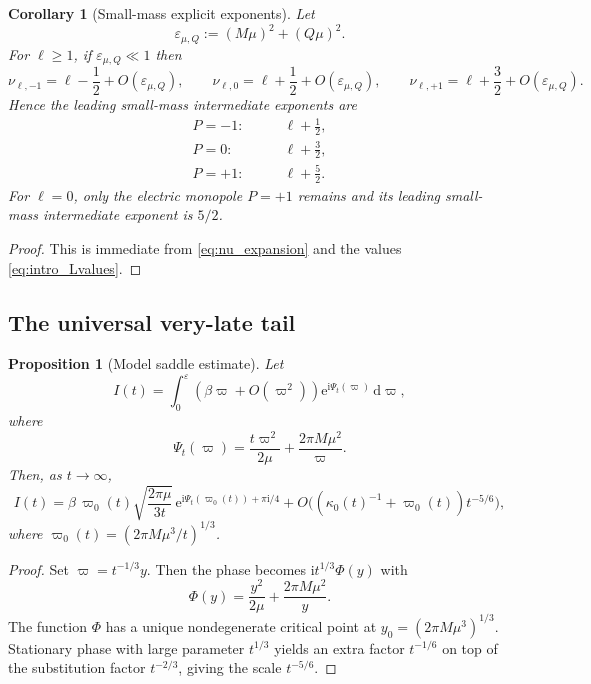 \documentclass[12pt]{article}
\numberwithin{equation}{section}
\theoremstyle{plain}
\newtheorem{proposition}[theorem]{Proposition}
\newtheorem{corollary}[theorem]{Corollary}
\theoremstyle{definition}
\theoremstyle{remark}
\newcommand{\ii}{\mathrm i}
\newcommand{\ee}{\mathrm e}
\newcommand{\dd}{\mathrm d}
\newcommand{\vp}{\varpi}
\newcommand{\kap}{\kappa}
\newcommand{\eps}{\varepsilon}
\begin{document}
\begin{corollary}[Small-mass explicit exponents]\label{cor:small_mass_explicit}
Let
\[
   \eps_{\mu,Q}:=(M\mu)^2+(Q\mu)^2.
\]
For $\ell\ge1$, if $\eps_{\mu,Q}\ll1$ then
\[
   \nu_{\ell,-1}=\ell-\frac12+O(\eps_{\mu,Q}),
   \qquad
   \nu_{\ell,0}=\ell+\frac12+O(\eps_{\mu,Q}),
   \qquad
   \nu_{\ell,+1}=\ell+\frac32+O(\eps_{\mu,Q}).
\]
Hence the leading small-mass intermediate exponents are
\begin{align*}
   P=-1:&\qquad \ell+\frac12,
   \\
   P=0:&\qquad \ell+\frac32,
   \\
   P=+1:&\qquad \ell+\frac52.
\end{align*}
For $\ell=0$, only the electric monopole $P=+1$ remains and its leading small-mass intermediate exponent is $5/2$.
\end{corollary}

\begin{proof}
This is immediate from \eqref{eq:nu_expansion} and the values \eqref{eq:intro_Lvalues}.
\end{proof}

\subsection{The universal very-late tail}

\begin{proposition}[Model saddle estimate]\label{prop:saddle_estimate}
Let
\begin{equation}\label{eq:generic_saddle_integral}
   I(t)=\int_0^\eps(\beta\vp+O(\vp^2))\ee^{\ii\Psi_t(\vp)}\,\dd\vp,
\end{equation}
where
\begin{equation}\label{eq:phase_function}
   \Psi_t(\vp)=\frac{t\vp^2}{2\mu}+\frac{2\pi M\mu^2}{\vp}.
\end{equation}
Then, as $t\to\infty$,
\begin{equation}\label{eq:saddle_estimate}
   I(t)
   =
   \beta\,\vp_0(t)\sqrt{\frac{2\pi\mu}{3t}}\,
   \ee^{\ii\Psi_t(\vp_0(t))+\pi\ii/4}
   +
   O\!\bigl((\kap_0(t)^{-1}+\vp_0(t))t^{-5/6}\bigr),
\end{equation}
where $\vp_0(t)=(2\pi M\mu^3/t)^{1/3}$.
\end{proposition}

\begin{proof}
Set $\vp=t^{-1/3}y$.  Then the phase becomes $\ii t^{1/3}\Phi(y)$ with
\[
   \Phi(y)=\frac{y^2}{2\mu}+\frac{2\pi M\mu^2}{y}.
\]
The function $\Phi$ has a unique nondegenerate critical point at $y_0=(2\pi M\mu^3)^{1/3}$.  Stationary phase with large parameter $t^{1/3}$ yields an extra factor $t^{-1/6}$ on top of the substitution factor $t^{-2/3}$, giving the scale $t^{-5/6}$.
\end{proof}
\end{document}
